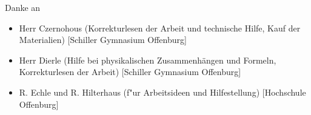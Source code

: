 Danke an \\
\begin{itemize}
    \item Herr Czernohous (Korrekturlesen der Arbeit und technische Hilfe, Kauf der Materialien) [Schiller Gymnasium Offenburg]
    \item Herr Dierle (Hilfe bei physikalischen Zusammenhängen und Formeln, Korrekturlesen der Arbeit) [Schiller Gymnasium Offenburg]
    \item R. Echle und R. Hilterhaus (f"ur Arbeitsideen und Hilfestellung) [Hochschule Offenburg]
\end{itemize}